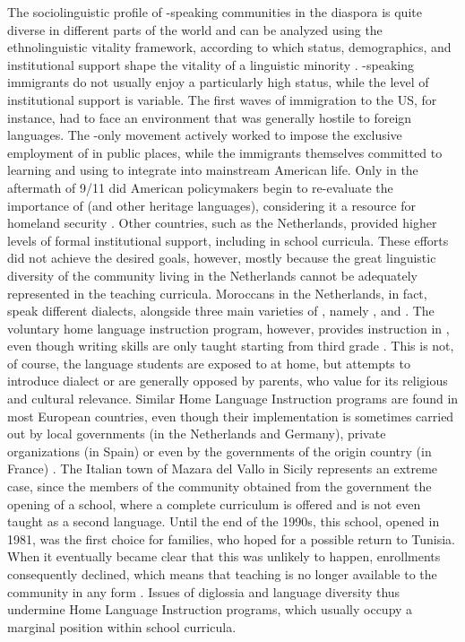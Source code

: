 \documentclass[output=paper]{langsci/langscibook}
\begin{document}
The sociolinguistic profile of -speaking communities in the {diaspora} is quite diverse in different parts of the world and can be analyzed using the ethnolinguistic vitality framework, according to which status, demographics, and institutional support shape the vitality of a linguistic minority \citep{GilesTaylor1977,Ehala2015}. -speaking immigrants do not usually enjoy a particularly high status, while the level of institutional support is variable. The first waves of immigration to the US, for instance, had to face an environment that was generally hostile to foreign languages. The -only movement actively worked to impose the exclusive employment of  in public places, while the immigrants themselves committed to learning and using  to integrate into mainstream American life. Only in the aftermath of 9/11 did American policymakers begin to re-evaluate the importance of  (and other heritage languages), considering it a resource for homeland security \citep[319--320]{Albirini2016}. Other countries, such as the Netherlands, provided higher levels of formal institutional support, including  in school curricula. These efforts did not achieve the desired goals, however, mostly because the great linguistic diversity of the  community living in the Netherlands cannot be adequately represented in the teaching curricula. Moroccans in the Netherlands, in fact, speak different  dialects, alongside three main varieties of , namely ,  and  \citep[160--161]{ExtraDeRuiter1994}. The voluntary home language instruction program, however, provides instruction in  , even though writing skills are only taught starting from third grade \citep[163--165]{ExtraDeRuiter1994}. This is not, of course, the language students are exposed to at home, but attempts to introduce  dialect or  are generally opposed by parents, who value   for its religious and cultural relevance. Similar Home Language Instruction programs are found in most European countries, even though their implementation is sometimes carried out by local governments (in the Netherlands and Germany), private organizations (in Spain) or even by the governments of the origin country (in France) \citep[264--265]{BoumansdeRuiter2002}. The Italian town of {Mazara del Vallo} in {Sicily} represents an extreme case, since the members of the  community obtained from the  government the opening of a  school, where a complete  curriculum is offered and  is not even taught as a second language. Until the end of the 1990s, this school, opened in 1981, was the first choice for  families, who hoped for a possible return to Tunisia. When it eventually became clear that this was unlikely to happen, enrollments consequently declined, which means that  teaching is no longer available to the community in any form \citep[73--77]{Danna2017book}. Issues of {diglossia} and language diversity thus undermine Home Language Instruction programs, which usually occupy a marginal position within school curricula.
\end{document}
